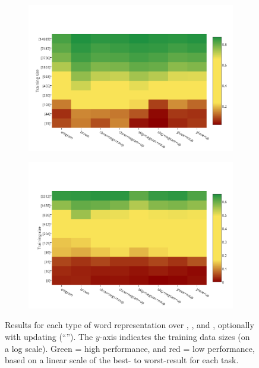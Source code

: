 \begin{figure}[t!]
\begin{subfigure}{7cm}
    \includegraphics[scale=0.38]{plots/map-ner-color-invert}    	
	\subcaption{\ner (\fscore)}	
	\label{ner}
\end{subfigure}
\begin{subfigure}{7cm}
	\centering
    \includegraphics[scale=0.38]{plots/map-mwe-color-invert}
	\subcaption{\mwe (\fscore)}		
	\label{mwe}
\end{subfigure}
\caption{Results for each type of word representation over \pos, \chunking, \ner and
  \mwe, optionally with updating (``\withup''). The $y$-axis indicates the training data
  sizes (on a log scale). Green = high performance, and red = low
  performance, based on a linear scale of the best- to worst-result for
  each task. }
\label{fig:heatmaps}
\end{figure}

